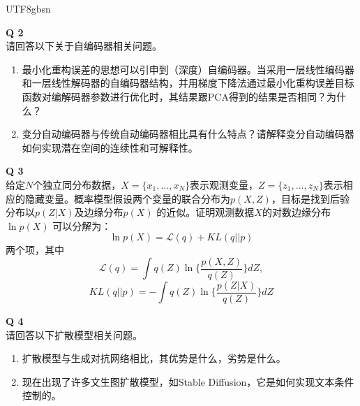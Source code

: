 \documentclass[a4paper, 11pt]{article}
\newenvironment{problem}[2][Q]
    { \begin{mdframed}[backgroundcolor=gray!20] \textbf{#1 #2} \\}
    {  \end{mdframed}}
\begin{document}
\begin{CJK}{UTF8}{gbsn}
\begin{problem}{2}
请回答以下关于自编码器相关问题。
\begin{enumerate}[1)]
\item 最小化重构误差的思想可以引申到（深度）自编码器。当采用一层线性编码器和一层线性解码器的自编码器结构，并用梯度下降法通过最小化重构误差目标函数对编解码器参数进行优化时，其结果跟PCA得到的结果是否相同？为什么？
\item 变分自动编码器与传统自动编码器相比具有什么特点？请解释变分自动编码器如何实现潜在空间的连续性和可解释性。
\end{enumerate}
\end{problem}


\begin{problem}{3}
给定$N$个独立同分布数据，$X=\{x_1,...,x_N\}$表示观测变量，$Z=\{z_1,...,z_N\}$表示相应的隐藏变量。概率模型假设两个变量的联合分布为$p(X,Z)$，目标是找到后验分布以$p(Z|X)$及边缘分布$p(X)$ 的近似。证明观测数据$X$的对数边缘分布 $\ln p(X)$ 可以分解为：
$$\ln p(X)=\mathcal{L}(q)+KL(q||p)$$
两个项，其中
$$\mathcal{L}(q)=\int q(Z)\ln \{\frac{p(X,Z)}{q(Z)}\}dZ,$$
$$KL(q||p)=-\int q(Z)\ln \{\frac{p(Z|X)}{q(Z)}\}dZ$$
\end{problem}



\begin{problem}{4}
请回答以下扩散模型相关问题。
\begin{enumerate}[1)]
\item 扩散模型与生成对抗网络相比，其优势是什么，劣势是什么。
\item 现在出现了许多文生图扩散模型，如Stable Diffusion，它是如何实现文本条件控制的。
\end{enumerate}
\end{problem}


\end{CJK}
\end{document}
